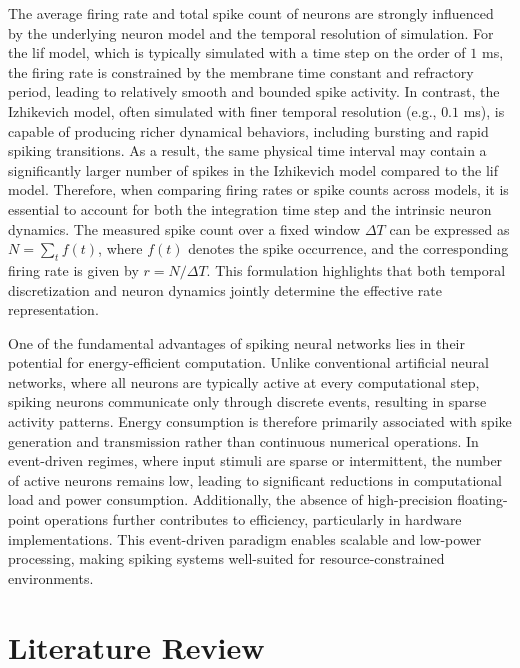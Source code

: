 The average firing rate and total spike count of neurons are strongly influenced by the underlying neuron model and the temporal resolution of simulation. For the \ac{lif} model, which is typically simulated with a time step on the order of $1$ ms, the firing rate is constrained by the membrane time constant and refractory period, leading to relatively smooth and bounded spike activity. In contrast, the Izhikevich model, often simulated with finer temporal resolution (e.g., $0.1$ ms), is capable of producing richer dynamical behaviors, including bursting and rapid spiking transitions. As a result, the same physical time interval may contain a significantly larger number of spikes in the Izhikevich model compared to the \ac{lif} model. Therefore, when comparing firing rates or spike counts across models, it is essential to account for both the integration time step and the intrinsic neuron dynamics. The measured spike count over a fixed window $\Delta T$ can be expressed as $N = \sum_{t} f(t)$, where $f(t)$ denotes the spike occurrence, and the corresponding firing rate is given by $r = N / \Delta T$. This formulation highlights that both temporal discretization and neuron dynamics jointly determine the effective rate representation.


One of the fundamental advantages of spiking neural networks lies in their potential for energy-efficient computation. Unlike conventional artificial neural networks, where all neurons are typically active at every computational step, spiking neurons communicate only through discrete events, resulting in sparse activity patterns. Energy consumption is therefore primarily associated with spike generation and transmission rather than continuous numerical operations. In event-driven regimes, where input stimuli are sparse or intermittent, the number of active neurons remains low, leading to significant reductions in computational load and power consumption. Additionally, the absence of high-precision floating-point operations further contributes to efficiency, particularly in hardware implementations. This event-driven paradigm enables scalable and low-power processing, making spiking systems well-suited for resource-constrained environments.


\section{Literature Review}


